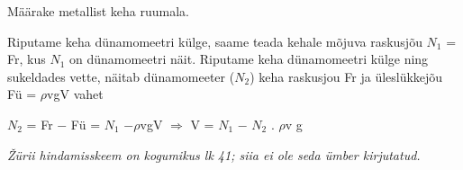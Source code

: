 
Määrake metallist keha ruumala.

\hint

\solu
Riputame keha dünamomeetri külge, saame teada kehale mõjuva raskusjõu $N_1$ = Fr, kus $N_1$ on dünamomeetri näit. Riputame keha dünamomeetri külge ning sukeldades vette, näitab dünamomeeter ($N_2$) keha raskusjou Fr ja üleslükkejõu Fü = $\rho$vgV vahet

$N_2$ = Fr $-$ Fü = $N_1$ $- \rho$vgV $\Rightarrow$ V = $N_1$ $-$ $N_2$ . $\rho$v g

\textit{Žürii hindamisskeem on kogumikus lk 41; siia ei ole seda ümber kirjutatud.}
\probend
